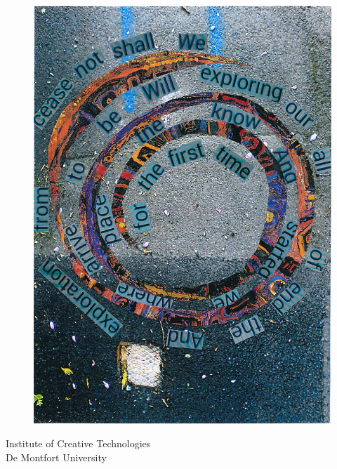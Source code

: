 
\begin{titlingpage}

\vspace*{\fill}
\begin{figure}[!htbp]
\centering
  \includegraphics[width=\linewidth]{spiral-sally.jpg}
\end{figure}
\vspace*{\fill}

\cleardoublepage

\begin{center}

Institute of Creative Technologies\\
De Montfort University

\vspace{2cm}


\end{center}
\end{titlingpage}
